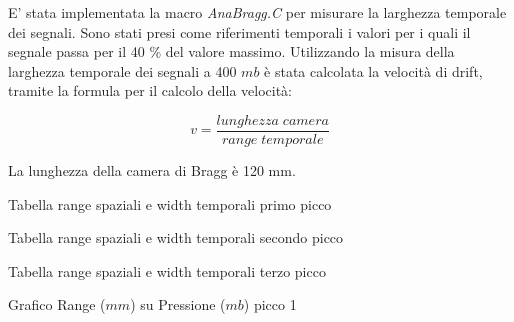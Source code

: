 E' stata implementata la macro \textit{AnaBragg.C} per misurare la larghezza temporale dei segnali. Sono stati presi come riferimenti temporali i valori per i quali il segnale
passa per il 40 \% del valore massimo. Utilizzando la misura della larghezza temporale dei segnali a 400 $mb$ è stata calcolata la velocità di drift, 
tramite la formula per il calcolo della velocità:

$$ v=\frac{lunghezza\;camera}{range\; temporale} $$

La lunghezza della camera di Bragg è 120 mm.
\begin{tabella}
 \centering
  
 \caption{Tabella range spaziali e width temporali primo picco}
 \label{tab:range_picco1.tex}
\end{tabella}

\begin{tabella}
 \centering
  
 \caption{Tabella range spaziali e width temporali secondo picco}
 \label{tab:range_picco2.tex}
\end{tabella}

\begin{tabella}
 \centering
  
 \caption{Tabella range spaziali e width temporali terzo picco}
 \label{tab:range_picco3.tex}
\end{tabella}



\begin{grafico}
 \centering
 \caption{Grafico Range ($mm$) su Pressione ($mb$) picco 1} 
 \label{gr:rangepicco1.tex} 
\end{grafico}


